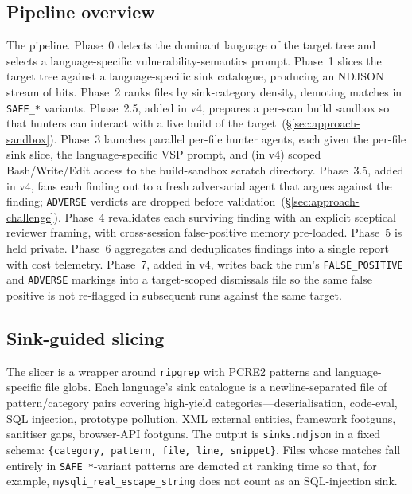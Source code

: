 \documentclass[11pt,a4paper]{article}
\begin{document}
\subsection{Pipeline overview}
\label{sec:approach-overview}

The pipeline. Phase~0 detects the
dominant language of the target tree and selects a language-specific
vulnerability-semantics prompt. Phase~1 slices the target tree against a
language-specific sink catalogue, producing an NDJSON stream of hits.
Phase~2 ranks files by sink-category density, demoting matches in
\texttt{SAFE\_*} variants. Phase~2.5, added in v4, prepares a per-scan
build sandbox so that hunters can interact with a live build of the
target~(\S\ref{sec:approach-sandbox}). Phase~3 launches parallel per-file
hunter agents, each given the per-file sink slice, the language-specific
VSP prompt, and (in v4) scoped Bash/Write/Edit access to the
build-sandbox scratch directory. Phase~3.5, added in v4, fans each
finding out to a fresh adversarial agent that argues against the finding;
\texttt{ADVERSE} verdicts are dropped before
validation~(\S\ref{sec:approach-challenge}). Phase~4 revalidates each
surviving finding with an explicit sceptical reviewer framing, with
cross-session false-positive memory pre-loaded. Phase~5 is held private.
Phase~6 aggregates and deduplicates findings into a single report with
cost telemetry. Phase~7, added in v4, writes back the run's
\texttt{FALSE\_POSITIVE} and \texttt{ADVERSE} markings into a
target-scoped dismissals file so the same false positive is not
re-flagged in subsequent runs against the same target.

\subsection{Sink-guided slicing}

The slicer is a wrapper around \texttt{ripgrep} with PCRE2 patterns and
language-specific file globs. Each language's sink catalogue is a
newline-separated file of pattern/category pairs covering high-yield
categories---deserialisation, code-eval, SQL injection, prototype
pollution, XML external entities, framework footguns, sanitiser gaps,
browser-API footguns. The output is \texttt{sinks.ndjson} in a fixed
schema: \texttt{\{category, pattern, file, line, snippet\}}. Files whose
matches fall entirely in \texttt{SAFE\_*}-variant patterns are demoted at
ranking time so that, for example, \texttt{mysqli\_real\_escape\_string}
does not count as an SQL-injection sink.
\end{document}
